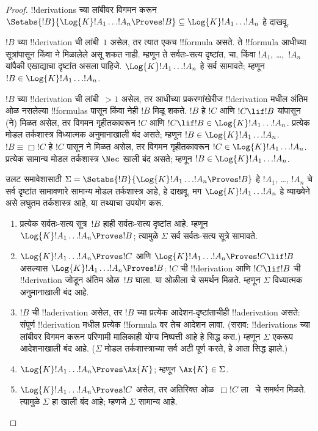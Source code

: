 \documentclass[../../../include/open-logic-section]{subfiles}
\begin{document}
\begin{proof}
  !!{derivation}s च्या लांबीवर विगमन करून
  $\Setabs{!B}{\Log{K} !A_1 \dots !A_n \Proves !B} \subseteq
  \Log{K} !A_1 \dots !A_n$ हे दाखवू.

  $!B$ च्या !!{derivation} ची लांबी~$1$ असेल,
  तर त्यात एकच !!{formula} असते. ते !!{formula} आधीच्या
  सूत्रांपासून \MP{} किंवा \Nec ने मिळालेले
  असू शकत नाही. म्हणून ते सर्वतः-सत्य दृष्टांत,
   चा,
  किंवा $!A_1$, \dots,~$!A_n$ यांपैकी एखाद्याचा
  दृष्टांत असला पाहिजे. $\Log{K}!A_1\dots!A_n$
  हे सर्व सामावते; म्हणून $!B \in \Log{K}!A_1
  \dots !A_n$.

  $!B$ च्या !!{derivation} ची लांबी~$> 1$
  असेल, तर आधीच्या प्रकरणांखेरीज !!{derivation}
  मधील अंतिम ओळ नसलेल्या !!{formula}s पासून
  \MP{} किंवा \Nec{} नेही
  $!B$ मिळू शकते. $!B$ हे $!C$ आणि
  $!C \lif !B$ यांपासून (\MP ने) मिळत असेल,
  तर विगमन गृहीतकावरून $!C$ आणि
  $!C \lif !B \in
  \Log{K}!A_1 \dots !A_n$. प्रत्येक मोडल
  तर्कशास्त्र विध्यात्मक अनुमानाखाली बंद असते;
  म्हणून $!B \in \Log{K}!A_1 \dots
  !A_n$. $!B \equiv \Box !C$ हे $!C$
  पासून \Nec ने मिळत असेल, तर विगमन
  गृहीतकावरून $!C
  \in \Log{K}!A_1 \dots !A_n$. प्रत्येक
  सामान्य मोडल तर्कशास्त्र $\Nec$ खाली बंद असते;
  म्हणून $!B \in
  \Log{K}!A_1\dots!A_n$.

  उलट समावेशासाठी $\Sigma = \Setabs{!B}{\Log{K} !A_1 \dots !A_n \Proves !B }$
  हे $!A_1$, \dots, $!A_n$ चे सर्व दृष्टांत
  सामावणारे सामान्य मोडल तर्कशास्त्र आहे, हे
  दाखवू. मग $\Log{K} !A_1 \dots !A_n$
  हे व्याख्येने असे लघुतम तर्कशास्त्र आहे,
  या तथ्याचा उपयोग करू.
  \begin{enumerate}
    \item प्रत्येक सर्वतः-सत्य सूत्र~$!B$ हाही
      सर्वतः-सत्य दृष्टांत आहे. म्हणून
      $\Log{K}!A_1\dots!A_n \Proves !B$;
      त्यामुळे $\Sigma$ सर्व सर्वतः-सत्य सूत्रे सामावते.
    \item $\Log{K}!A_1\dots!A_n \Proves !C$
      आणि $\Log{K}!A_1\dots!A_n \Proves !C \lif !B$
      असल्यास $\Log{K}!A_1\dots!A_n \Proves !B$:
      $!C$ ची !!{derivation} आणि $!C \lif !B$
      ची !!{derivation} जोडून अंतिम ओळ~$!B$
      घाला. या ओळीला \MP{} चे समर्थन मिळते.
      म्हणून $\Sigma$ विध्यात्मक अनुमानाखाली बंद आहे.
    \item $!B$ ची !!a{derivation} असेल, तर
      $!B$ च्या प्रत्येक आदेशन-दृष्टांताचीही
      !!a{derivation} असते: संपूर्ण !!{derivation}
      मधील प्रत्येक !!{formula} वर तेच आदेशन लावा.
      (सराव: !!{derivation}s च्या लांबीवर विगमन
      करून परिणामी मालिकाही योग्य निष्पत्ती
      आहे हे सिद्ध करा.) म्हणून $\Sigma$ एकरूप
      आदेशनाखाली बंद आहे. ($\Sigma$ मोडल तर्कशास्त्राच्या
      सर्व अटी पूर्ण करते, हे आता सिद्ध झाले.)
    \item $\Log{K}!A_1\dots!A_n \Proves \Ax{K}$;
      म्हणून $\Ax{K} \in \Sigma$.
    \item $\Log{K}!A_1\dots!A_n \Proves !C$
      असेल, तर अतिरिक्त ओळ~$\Box !C$ ला~\Nec
      चे समर्थन मिळते. त्यामुळे $\Sigma$ हा
      \Nec खाली बंद आहे; म्हणजे $\Sigma$ सामान्य आहे.
  \end{enumerate}
\end{proof}
\end{document}
